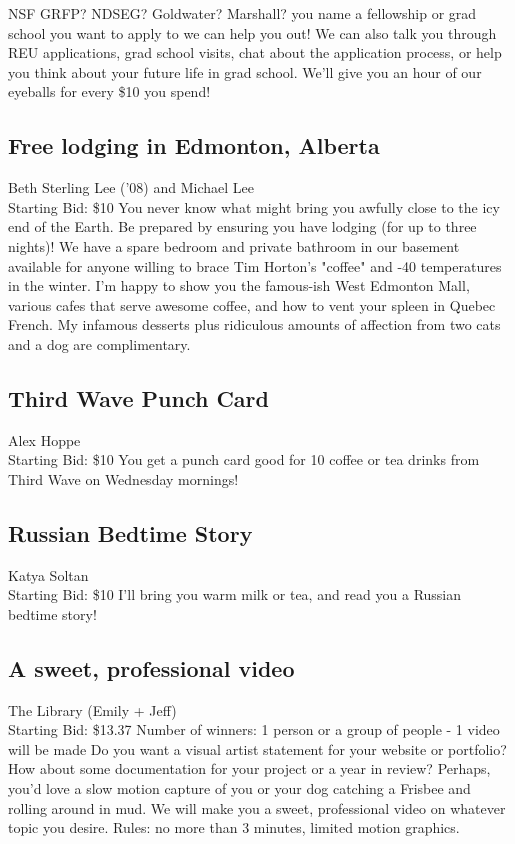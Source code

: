 \documentclass[11pt]{article}
\begin{document}
NSF GRFP? NDSEG? Goldwater? Marshall? you name a fellowship or grad school you want to apply to we can help you out! We can also talk you through REU applications, grad school visits, chat about the application process, or help you think about your future life in grad school. We’ll give you an hour of our eyeballs for every \$10 you spend!
\subsection{Free lodging in Edmonton, Alberta}
Beth Sterling Lee ('08) and Michael Lee
\\
Starting Bid: \$10
\newline
You never know what might bring you awfully close to the icy end of the Earth. Be prepared by ensuring you have lodging (for up to three nights)!  We have a spare bedroom and private bathroom in our basement available for anyone willing to brace Tim Horton's "coffee" and -40 temperatures in the winter. I'm happy to show you the famous-ish West Edmonton Mall, various cafes that serve awesome coffee, and how to vent your spleen in Quebec French. My infamous desserts plus ridiculous amounts of affection from two cats and a dog are complimentary.
\subsection{Third Wave Punch Card}
Alex Hoppe
\\
Starting Bid: \$10
\newline
You get a punch card good for 10 coffee or tea drinks from Third Wave on Wednesday mornings!
\subsection{Russian Bedtime Story}
Katya Soltan
\\
Starting Bid: \$10
\newline
I'll bring you warm milk or tea, and read you a Russian bedtime story!
\subsection{A sweet, professional video}
The Library (Emily + Jeff)
\\
Starting Bid: \$13.37
\newline
Number of winners: 1 person or a group of people - 1 video will be made
\newline
Do you want a visual artist statement for your website or portfolio? How about some documentation for your project or a year in review? Perhaps, you'd love a slow motion capture of you or your dog catching a Frisbee and rolling around in mud. We will make you a sweet, professional video on whatever topic you desire. Rules: no more than 3 minutes, limited motion graphics.
\end{document}
